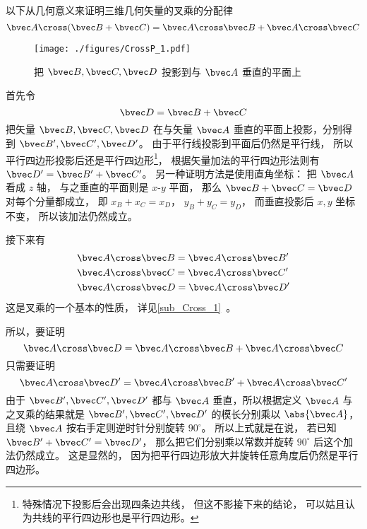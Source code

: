 
以下从几何意义来证明三维几何矢量的叉乘的分配律
\begin{equation}
\bvec A \cross (\bvec B + \bvec C) = \bvec A \cross \bvec B + \bvec A \cross \bvec C
\end{equation}

\begin{figure}[ht]
\vskip-10pt
\centering
\texttt{[image: ./figures/CrossP\_1.pdf]}
\caption{把 $\bvec B,\bvec C,\bvec D$ 投影到与 $\bvec A$ 垂直的平面上}
\end{figure}

首先令
\begin{equation}
\bvec D = \bvec B + \bvec C
\end{equation}
把矢量 $\bvec B,\bvec C,\bvec D$ 在与矢量 $\bvec A$ 垂直的平面上投影，分别得到 $\bvec B',\bvec C',\bvec D'$。 由于平行线投影到平面后仍然是平行线， 所以平行四边形投影后还是平行四边形\footnote{特殊情况下投影后会出现四条边共线， 但这不影接下来的结论， 可以姑且认为共线的平行四边形也是平行四边形。}， 根据矢量加法的平行四边形法则有 $\bvec D'=\bvec B'+\bvec C'$。 另一种证明方法是使用直角坐标： 把 $\bvec A$ 看成 $z$ 轴， 与之垂直的平面则是 $x$-$y$ 平面， 那么 $\bvec B + \bvec C = \bvec D$ 对每个分量都成立， 即 $x_B + x_C = x_D$， $y_B + y_C = y_D$， 而垂直投影后 $x,y$ 坐标不变， 所以该加法仍然成立。

接下来有
\begin{equation}\label{eq_CrossP_2}
\begin{aligned}
&\bvec A \cross \bvec B = \bvec A \cross \bvec B'\\
&\bvec A \cross \bvec C = \bvec A \cross \bvec C'\\
&\bvec A \cross \bvec D = \bvec A \cross \bvec D'
\end{aligned}
\end{equation} 
这是叉乘的一个基本的性质， 详见\autoref{sub_Cross_1}~。

所以，要证明
\begin{equation}\label{eq_CrossP_1}
\bvec A \cross \bvec D = \bvec A \cross \bvec B + \bvec A \cross \bvec C
\end{equation}
只需要证明
\begin{equation}
\bvec A \cross \bvec D' = \bvec A \cross \bvec B' + \bvec A \cross \bvec C'
\end{equation}
由于 $\bvec B', \bvec C', \bvec D'$ 都与 $\bvec A$ 垂直，所以根据定义 $\bvec A$ 与之叉乘的结果就是 $\bvec B', \bvec C', \bvec D'$ 的模长分别乘以 $\abs {\bvec A}$， 且绕 $\bvec A$ 按右手定则逆时针分别旋转 $90^\circ$。 所以上式就是在说， 若已知 $\bvec B' + \bvec C' = \bvec D'$， 那么把它们分别乘以常数并旋转 $90^\circ$ 后这个加法仍然成立。 这是显然的， 因为把平行四边形放大并旋转任意角度后仍然是平行四边形。


